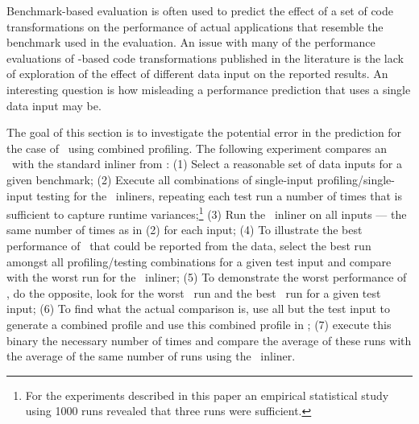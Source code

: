 
Benchmark-based evaluation is often used to predict the effect of a set of code transformations on the performance of actual applications that resemble the benchmark used in the evaluation. An issue with many of the performance evaluations of \FDO-based code transformations published in the literature is the lack of exploration of the effect of different data input on the reported results. An interesting question is how misleading a performance prediction that uses a single data input may be.

The goal of this section is to investigate the potential error in the prediction for the case of \FDI\ using combined profiling. The following experiment compares an \FDI\ with the standard inliner from \llvm: (1) Select a reasonable set of data inputs for a given benchmark; (2) Execute all combinations of single-input profiling/single-input testing for the \FDO\ inliners, repeating each test run a number of times that is sufficient to capture runtime variances;\footnote{For the experiments described in this paper an empirical statistical study using 1000 runs revealed that three runs were sufficient.}  (3) Run the \llvm\ inliner on all inputs --- the same number of times as in (2) for each input; (4) To illustrate the best performance of \FDI\ that could be reported from the data, select the best run amongst all profiling/testing combinations for a given test input and compare with the worst run for the \llvm\ inliner; (5) To demonstrate the worst performance of \FDI, do the opposite, look for the worst \FDI\ run and the best \llvm\ run for a given test input; (6) To find what the actual comparison is, use all but the test input to generate a combined profile and use this combined profile in \FDI; (7) execute this binary the necessary number of times and compare the average of these runs with the average of the same number of runs using the \llvm\ inliner.

